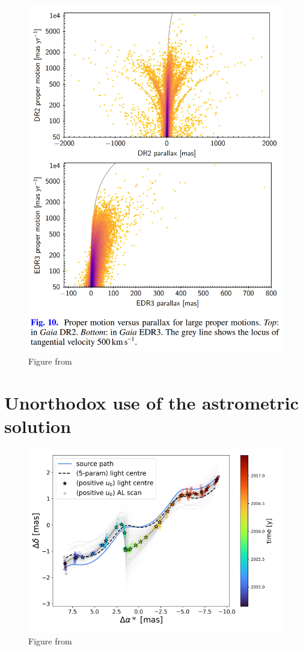 \documentclass[twocolumn]{aastex631}
\begin{document}
\begin{figure}
	\includegraphics[width=\columnwidth]{parallaxvspropermotiondr2edr3.png}
	\caption{Figure from \cite{fabriciusGaia2021}}
\end{figure}

\section{Unorthodox use of the astrometric solution} \label{sec:unorthodox}

\begin{figure}
	\includegraphics[width=\columnwidth]{microlensingpath.png}
	\caption{Figure from \cite{jablonskaThere2022}}
\end{figure}
\end{document}
